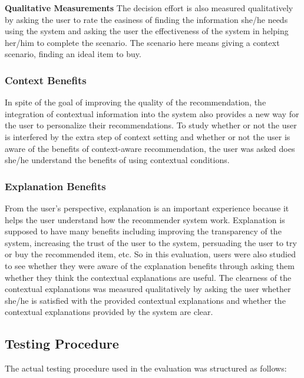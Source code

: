\textbf{Qualitative Measurements} The decision effort is also measured qualitatively by asking the user to rate the easiness of finding the information she/he needs using the system and asking the user the effectiveness of the system in helping her/him to complete the scenario. The scenario here means giving a context scenario, finding an ideal item to buy.

\subsubsection{Context Benefits} \label{sec:ts_tf_cb}

In spite of the goal of improving the quality of the recommendation, the integration of contextual information into the system also provides a new way for the user to personalize their recommendations. To study whether or not the user is interfered by the extra step of context setting and whether or not the user is aware of the benefits of context-aware recommendation, the user was asked does she/he understand the benefits of using contextual conditions.

\subsubsection{Explanation Benefits} \label{sec:ts_tf_eb}

From the user's perspective, explanation is an important experience because it helps the user understand how the recommender system work. Explanation is supposed to have many benefits including improving the transparency of the system, increasing the trust of the user to the system, persuading the user to try or buy the recommended item, etc. So in this evaluation, users were also studied to see whether they were aware of the explanation benefits through asking them whether they think the contextual explanations are useful. The clearness of the contextual explanations was measured qualitatively by asking the user whether she/he is satisfied with the provided contextual explanations and whether the contextual explanations provided by the system are clear.

\subsection{Testing Procedure} \label{sec:ts_tp}

The actual testing procedure used in the evaluation was structured as follows:

